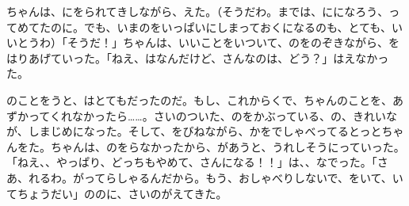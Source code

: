 ちゃんは、にをられてきしながら、えた。（そうだわ。までは、にになろう、ってめてたのに。でも、いまのをいっぱいにしまっておくになるのも、とても、いいとうわ）「そうだ！」ちゃんは、いいことをいついて、のをのぞきながら、をはりあげていった。「ねえ、はなんだけど、さんなのは、どう？」はえなかった。

のことをうと、はとてもだったのだ。もし、これからくで、ちゃんのことを、あずかってくれなかったら……。さいのついた、のをかぶっている、の、きれいなが、しまじめになった。そして、をびねながら、かをでしゃべってるとっとちゃんをた。ちゃんは、のをらなかったから、があうと、うれしそうにっていった。「ねえ、、やっぱり、どっちもやめて、さんになる！！」は、、なでった。「さあ、れるわ。がってらしゃるんだから。もう、おしゃべりしないで、をいて、いてちょうだい」ののに、さいのがえてきた。




